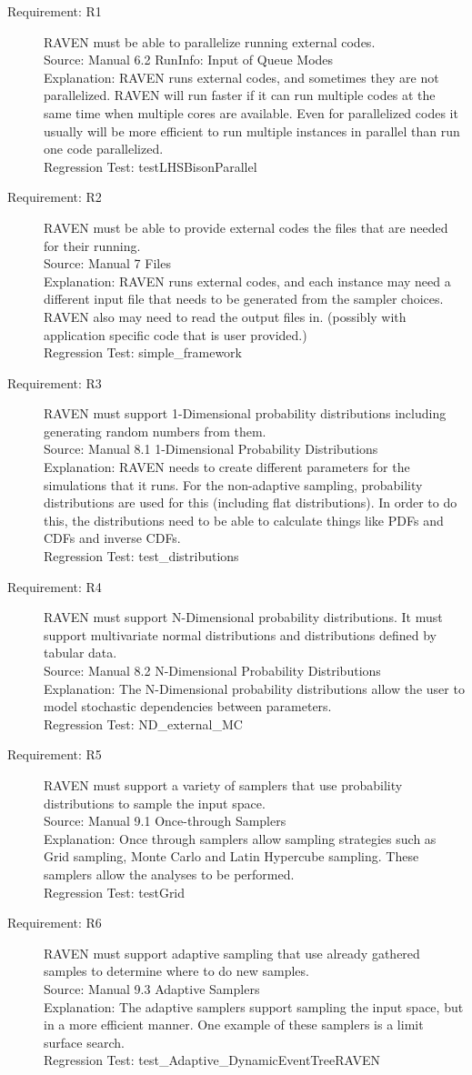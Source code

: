 \documentclass{article}
\newcommand{\requirement}[5]{\item[Requirement: #1] #2 \\Source: #3\\Explanation: #4\\Regression Test: #5}
\begin{document}
\begin{description}
\requirement{R1}{RAVEN must be able to parallelize running external codes.}
{Manual 6.2 RunInfo: Input of Queue Modes}
{RAVEN runs external codes, and sometimes they are not parallelized.  RAVEN will run faster if it can run multiple codes at the same time when multiple cores are available.  Even for parallelized codes it usually will be more efficient to run multiple instances in parallel than run one code parallelized.}
{testLHSBisonParallel}

\requirement{R2}{RAVEN must be able to provide external codes the files that are needed for their running.}
{Manual 7 Files}
{RAVEN runs external codes, and each instance may need a different input file that needs to be generated from the sampler choices.  RAVEN also may need to read the output files in. (possibly with application specific code that is user provided.)}
{simple\_framework}

\requirement{R3}{RAVEN must support 1-Dimensional probability distributions including generating random numbers from them.}
{Manual 8.1 1-Dimensional Probability Distributions}
{RAVEN needs to create different parameters for the simulations that it runs.  For the non-adaptive sampling, probability distributions are used for this (including flat distributions).  In order to do this, the distributions need to be able to calculate things like PDFs and CDFs and inverse CDFs.}
{test\_distributions}

\requirement{R4}{RAVEN must support N-Dimensional probability distributions.  It must support multivariate normal distributions and distributions defined by tabular data.}
{Manual 8.2 N-Dimensional Probability Distributions}
{The N-Dimensional probability distributions allow the user to model stochastic dependencies between parameters.}
{ND\_external\_MC}

\requirement{R5}{RAVEN must support a variety of samplers that use probability distributions to sample the input space.}
{Manual 9.1 Once-through Samplers}
{Once through samplers allow sampling strategies such as Grid sampling, Monte Carlo and Latin Hypercube sampling.  These samplers allow the analyses to be performed.}
{testGrid}

\requirement{R6}{RAVEN must support adaptive sampling that use already gathered samples to determine where to do new samples.}
{Manual 9.3 Adaptive Samplers}
{The adaptive samplers support sampling the input space, but in a more efficient manner.  One example of these samplers is a limit surface search.}
{test\_Adaptive\_DynamicEventTreeRAVEN}


\end{description}
\end{document}
